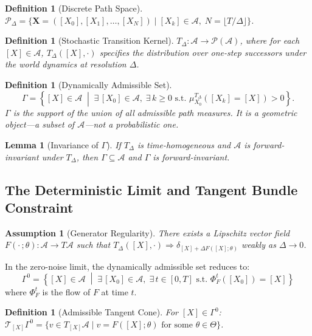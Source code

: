\documentclass[12pt, oneside]{article}
\newtheorem{lemma}[theorem]{Lemma}
\newtheorem{definition}[theorem]{Definition}
\newtheorem{assumption}[theorem]{Assumption}
\begin{document}
\begin{definition}[Discrete Path Space]
$\mathcal{P}_\Delta = \{ \mathbf{X} = ([X_0],[X_1],\ldots,[X_N]) \mid [X_k] \in \mathcal{A},\;
N = \lfloor T/\Delta \rfloor \}$.
\end{definition}

\begin{definition}[Stochastic Transition Kernel]
$T_\Delta : \mathcal{A} \to \mathcal{P}(\mathcal{A})$, where for each $[X] \in \mathcal{A}$,
$T_\Delta([X],\cdot)$ specifies the distribution over one-step successors under the world
dynamics at resolution $\Delta$.
\end{definition}

\begin{definition}[Dynamically Admissible Set]
\[
\Gamma = \left\{ [X] \in \mathcal{A} \;\middle|\;
\exists\, [X_0] \in \mathcal{A},\; \exists\, k \ge 0 \text{ s.t. }
\mu_{X_0}^{T_\Delta}([X_k] = [X]) > 0 \right\}.
\]
$\Gamma$ is the support of the union of all admissible path measures. It is a geometric
object---a subset of $\mathcal{A}$---not a probabilistic one.
\end{definition}

\begin{lemma}[Invariance of $\Gamma$]
If $T_\Delta$ is time-homogeneous and $\mathcal{A}$ is forward-invariant under $T_\Delta$,
then $\Gamma \subseteq \mathcal{A}$ and $\Gamma$ is forward-invariant.
\end{lemma}

\subsection{The Deterministic Limit and Tangent Bundle Constraint}

\begin{assumption}[Generator Regularity]
\label{ass:generator}
There exists a Lipschitz vector field $F(\cdot\,;\theta) : \mathcal{A} \to T\mathcal{A}$
such that $T_\Delta([X],\cdot) \Rightarrow \delta_{[X]+\Delta F([X];\theta)}$ weakly as
$\Delta \to 0$.
\end{assumption}

In the zero-noise limit, the dynamically admissible set reduces to:
\[
\Gamma^0 = \left\{ [X] \in \mathcal{A} \;\middle|\;
\exists\, [X_0] \in \mathcal{A},\; \exists\, t \in [0,T] \text{ s.t. }
\Phi^t_F([X_0]) = [X] \right\}
\]
where $\Phi^t_F$ is the flow of $F$ at time $t$.

\begin{definition}[Admissible Tangent Cone]
For $[X] \in \Gamma^0$:
$\mathcal{T}_{[X]}\Gamma^0 = \{v \in T_{[X]}\mathcal{A} \mid v = F([X];\theta)
\text{ for some } \theta \in \Theta\}$.
\end{definition}
\end{document}
